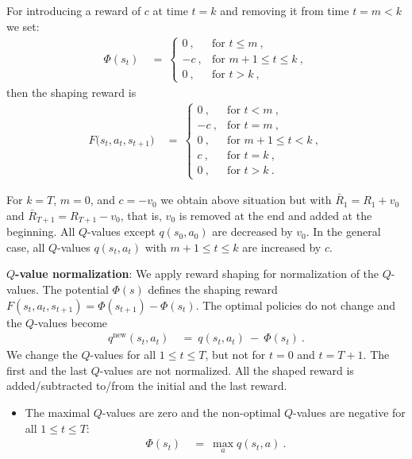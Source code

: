 \documentclass{article}
\newcommand\nn{\mathrm{new}}
\renewcommand{\leq}{\leqslant}
\begin{document}
\begin{appendices}
For introducing a reward of $c$ at time $t=k$ and removing
it from time $t=m<k$ we set:
\begin{align}
  \Phi(s_t)  \ &= \
  \begin{cases}
    0 \ , & \text{for } t \leq m \ , \\
    -c \ , & \text{for } m+1 \leq t \leq k \ ,\\
    0 \ , & \text{for } t > k \ ,
  \end{cases} 
\end{align}
then the shaping reward is
\begin{align}
  F \big( s_t,a_t,s_{t+1} \big)  \ &= \
  \begin{cases}
    0 \ , & \text{for } t < m \ , \\
    - c \ , & \text{for } t = m  \ , \\
    0 \ , & \text{for } m+1 \leq t < k \ , \\
    c \ , & \text{for } t = k  \ , \\
    0 \ , & \text{for } t > k \ .
  \end{cases} 
\end{align}

For $k=T$, $m=0$, and $c=-v_0$ we obtain above situation but with
$\bar{R}_1=R_1+v_0$ and $\bar{R}_{T+1}=R_{T+1}-v_0$,
that is, $v_0$ is removed at the end and
added at the beginning. All $Q$-values except $q(s_0,a_0)$ are
decreased by $v_0$.
In the general case,
all $Q$-values $q(s_t,a_t)$ with
$m+1 \leq t \leq k$ are increased by $c$.


{\bf $Q$-value normalization}:
We apply reward shaping \cite{Ng:99,Wiewiora:03} for normalization of
the $Q$-values.
The potential $\Phi(s)$ defines the shaping reward
$F(s_t,a_t,s_{t+1})= \Phi(s_{t+1}) - \Phi(s_t)$.
The optimal policies do not change and the $Q$-values become
\begin{align}
   q^{\nn}(s_t,a_t)  \ &= \  q(s_t,a_t) \ - \ \Phi(s_t) \ .
\end{align}
We change the $Q$-values for all $1\leq t \leq T$, but not
for $t=0$ and $t=T+1$. The first and the last $Q$-values are not normalized.
All the shaped reward is added/subtracted to/from the initial and the
last reward.

\begin{itemize}
\item The maximal $Q$-values are zero and the non-optimal $Q$-values are negative
for all $1\leq t \leq T$:
\begin{align}
  \Phi(s_t)   \ &= \ \max_{a} q(s_t,a) \ .
\end{align}
  

\end{itemize}
\end{appendices}
\end{document}
